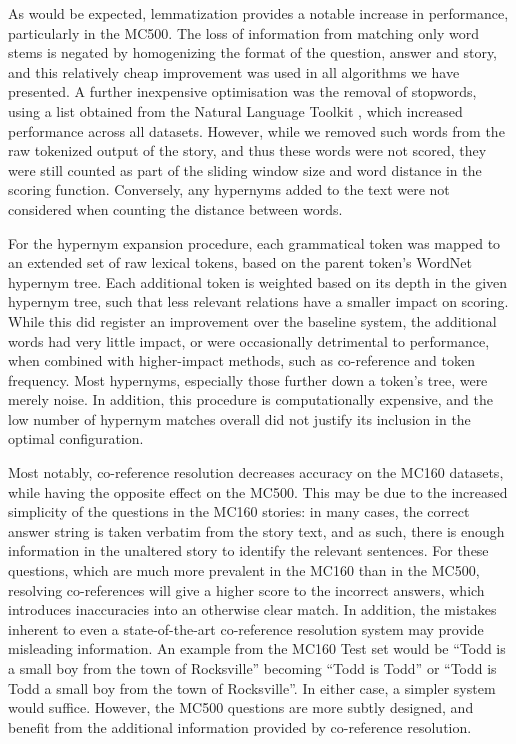 \documentclass[11pt]{article}
\begin{document}
As would be expected, lemmatization provides a notable increase in performance, particularly in the MC500. The loss of information from matching only word stems is negated by homogenizing the format of the question, answer and story, and this relatively cheap improvement was used in all algorithms we have presented. A further inexpensive optimisation was the removal of stopwords, using a list obtained from the Natural Language Toolkit \cite{bird2006nltk}, which increased performance across all datasets. However, while we removed such words from the raw tokenized output of the story, and thus these words were not scored, they were still counted as part of the sliding window size and word distance in the scoring function. Conversely, any hypernyms added to the text were not considered when counting the distance between words.

For the hypernym expansion procedure, each grammatical token was mapped to an extended set of raw lexical tokens, based on the parent token's WordNet hypernym tree. Each additional token is weighted based on its depth in the given hypernym tree, such that less relevant relations have a smaller impact on scoring. While this did register an improvement over the baseline system, the additional words had very little impact, or were occasionally detrimental to performance, when combined with higher-impact methods, such as co-reference and token frequency. Most hypernyms, especially those further down a token's tree, were merely noise. In addition, this procedure is computationally expensive, and the low number of hypernym matches overall did not justify its inclusion in the optimal configuration.

Most notably, co-reference resolution decreases accuracy on the MC160 datasets, while having the opposite effect on the MC500. This may be due to the increased simplicity of the questions in the MC160 stories: in many cases, the correct answer string is taken verbatim from the story text, and as such, there is enough information in the unaltered story to identify the relevant sentences. For these questions, which are much more prevalent in the MC160 than in the MC500, resolving co-references will give a higher score to the incorrect answers, which introduces inaccuracies into an otherwise clear match. In addition, the mistakes inherent to even a state-of-the-art co-reference resolution system may provide misleading information. An example from the MC160 Test set would be ``Todd is a small boy from the town of Rocksville'' becoming ``Todd is Todd'' or ``Todd is Todd a small boy from the town of Rocksville''. In either case, a simpler system would suffice. However, the MC500 questions are more subtly designed, and benefit from the additional information provided by co-reference resolution.
\end{document}

